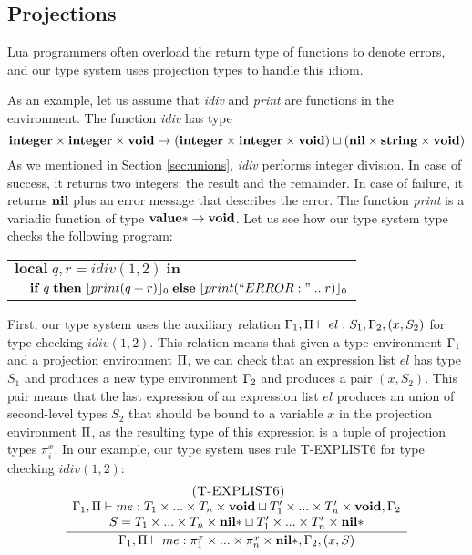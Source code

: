 \subsection{Projections}
\label{sec:fap}

Lua programmers often overload the return type of functions to denote errors,
and our type system uses projection types to handle this idiom.

As an example, let us assume that \emph{idiv} and \emph{print} are functions
in the environment.
The function \emph{idiv} has type
\[
\mathbf{integer} \times \mathbf{integer} \times \mathbf{void} \rightarrow (\mathbf{integer} \times \mathbf{integer} \times \mathbf{void}) \sqcup (\mathbf{nil} \times \mathbf{string} \times \mathbf{void})
\]
As we mentioned in Section \ref{sec:unions}, \emph{idiv} performs
integer division.
In case of success, it returns two integers: the result and the remainder.
In case of failure, it returns $\mathbf{nil}$ plus an error message that describes
the error.
The function \emph{print} is a variadic function of type
$\mathbf{value}{*} \rightarrow \mathbf{void}$.
Let us see how our type system type checks the following program:
\begin{center}
\begin{tabular}{ll}
\multicolumn{2}{l}{$\mathbf{local} \; q, r = idiv(1, 2) \; \mathbf{in}$}\\
& \multicolumn{1}{l}{$\mathbf{if} \; q \; \mathbf{then} \; \lfloor print(q + r) \rfloor_{0} \; \mathbf{else} \; \lfloor print(``ERROR: " \; .. \; r) \rfloor_{0}$}
\end{tabular}
\end{center}

First, our type system uses the auxiliary relation
$\Gamma_{1}, \Pi \vdash el : S_{1}, \Gamma_{2}, (x,S_{2})$
for type checking $idiv(1, 2)$.
This relation means that given a type environment $\Gamma_{1}$ and
a projection environment $\Pi$, we can check that an expression
list $el$ has type $S_{1}$ and produces a new type environment $\Gamma_{2}$
and produces a pair $(x,S_{2})$.
This pair means that the last expression of an expression list $el$
produces an union of second-level types $S_{2}$ that should be bound
to a variable $x$ in the projection environment $\Pi$,
as the resulting type of this expression is a tuple of projection
types $\pi_{i}^{x}$.
In our example, our type system uses rule \textsc{T-EXPLIST6} for
type checking $idiv(1, 2)$:
\[
\begin{array}{c}
\; (\textsc{T-EXPLIST6})\\
\dfrac{\begin{array}{c}
       \Gamma_{1}, \Pi \vdash me:T_{1} \times ... \times T_{n} \times \mathbf{void} \sqcup T_{1}' \times ... \times T_{n}' \times \mathbf{void}, \Gamma_{2}\\
       S = T_{1} \times ... \times T_{n} \times \mathbf{nil}{*} \sqcup T_{1}' \times ... \times T_{n}' \times \mathbf{nil}{*}
       \end{array}}
      {\Gamma_{1}, \Pi \vdash me:\pi_{1}^{x} \times ... \times \pi_{n}^{x} \times \mathbf{nil}{*}, \Gamma_{2}, (x,S)}
\end{array}
\]

